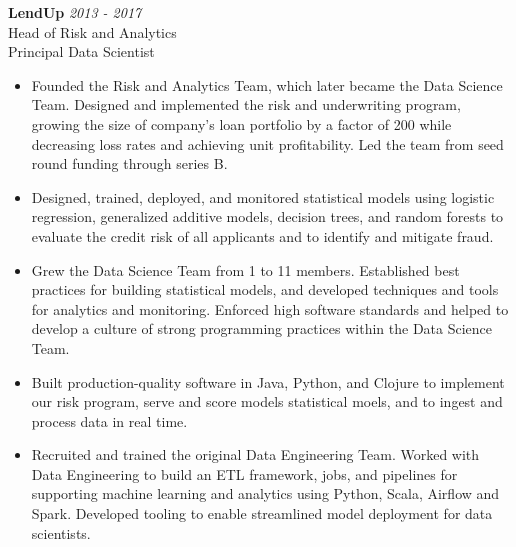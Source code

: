 \documentclass[9pt]{article}
\newenvironment{changemargin}[2]{%
  \begin{list}{}{%
    \setlength{\topsep}{0pt}%
    \setlength{\leftmargin}{#1}%
    \setlength{\rightmargin}{#2}%
    \setlength{\listparindent}{\parindent}%
    \setlength{\itemindent}{\parindent}%
    \setlength{\parsep}{\parskip}%
  }%
  \item[]}{\end{list}
}
\newenvironment{body} {
  \vspace*{-16pt}
\begin{changemargin}{-0.25in}{-0.5in}
  }
{\end{changemargin}
}
\begin{document}
\begin{body}

  \vspace{14pt}

  \textbf{LendUp} \hfill \emph{2013 - 2017}\\
  Head of Risk and Analytics \\
  Principal Data Scientist
  \begin{itemize}


    \item Founded the Risk and Analytics Team, which later became the Data Science Team.  Designed and implemented the risk and underwriting program, growing the size of company's loan portfolio by a factor of 200 while decreasing loss rates and achieving unit profitability.  Led the team from seed round funding through series B. \\

    \item Designed, trained, deployed, and monitored statistical models using logistic regression, generalized additive models, decision trees, and random forests to evaluate the credit risk of all applicants and to identify and mitigate fraud. \\

    \item Grew the Data Science Team from 1 to 11 members. Established best practices for building statistical models, and developed techniques and tools for analytics and monitoring.  Enforced high software standards and helped to develop a culture of strong programming practices within the Data Science Team. \\

    \item Built production-quality software in Java, Python, and Clojure to implement our risk program, serve and score models statistical moels, and to ingest and process data in real time. \\

    \item Recruited and trained the original Data Engineering Team.  Worked with Data Engineering to build an ETL framework, jobs, and pipelines for supporting machine learning and analytics using Python, Scala, Airflow and Spark.  Developed tooling to enable streamlined model deployment for data scientists. \\
  \end{itemize}


\end{body}
\end{document}
